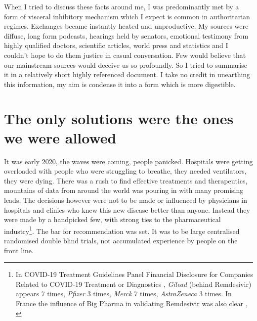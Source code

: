 \documentclass[11pt,a4paper,notitlepage]{report}
\begin{document}
When I tried to discuss these facts around me, I was predominantly met by a form of visceral inhibitory mechanism which I expect is common in authoritarian regimes. Exchanges became instantly heated and unproductive. My sources were diffuse, long form podcasts, hearings held by senators, emotional testimony from highly qualified doctors, scientific articles, world press and statistics and I couldn't hope to do them justice in casual conversation. Few would believe that our mainstream sources would deceive us so profoundly. So I tried to summarise it in a relatively short highly referenced document. I take no credit in unearthing this information, my aim is condense it into a form which is more digestible.

\section*{The only solutions were the ones we were allowed}

It was early 2020, the waves were coming, people panicked. Hospitals were getting overloaded with people who were struggling to breathe, they needed ventilators, they were dying. There was a rush to find effective treatments and therapeutics, mountains of data from around the world was pouring in with many promising leads. The decisions however were not to be made or influenced by physicians in hospitals and clinics who knew this new disease better than anyone. Instead they were made by a handpicked few, with strong ties to the pharmaceutical industry\footnote{In COVID-19 Treatment Guidelines Panel Financial Disclosure for Companies Related to COVID-19 Treatment or Diagnostics \cite{nihTreatmentPanelFinancialDisclosure}, \textit{Gilead} (behind Remdesivir) appears 7 times, \textit{Pfizer} 3 times, \textit{Merck} 7 times, \textit{AstraZeneca} 3 times. In France the influence of Big Pharma in validating Remdesivir was also clear \cite{doi:10.1177/1440783320936740}, \cite{mediapart31032020}}. The bar for recommendation was set. It was to be large centralised randomised double blind trials, not accumulated experience by people on the front line.
\end{document}
